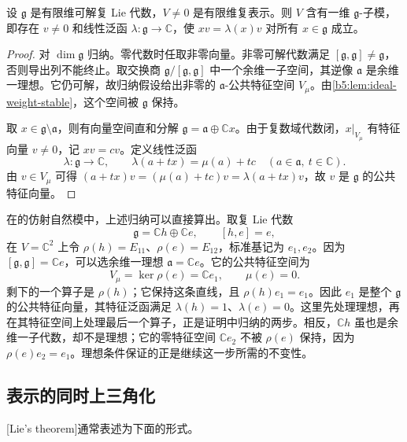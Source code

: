 \begin{theorem}\label{b5:thm:lie-common-eigenvector}
	设 \(\mathfrak g\) 是有限维可解复 Lie 代数，\(V\ne0\) 是有限维复表示。则 \(V\) 含有一维 \(\mathfrak g\)-子模，即存在 \(v\ne0\) 和线性泛函 \(\lambda:\mathfrak g\rightarrow\mathbb C\)，使 \(xv=\lambda(x)v\) 对所有 \(x\in\mathfrak g\) 成立。
\end{theorem}
\begin{proof}
	对 \(\dim\mathfrak g\) 归纳。零代数时任取非零向量。非零可解代数满足 \([\mathfrak g,\mathfrak g]\ne\mathfrak g\)，否则导出列不能终止。取交换商 \(\mathfrak g/[\mathfrak g,\mathfrak g]\) 中一个余维一子空间，其逆像 \(\mathfrak a\) 是余维一理想。它仍可解，故归纳假设给出非零的 \(\mathfrak a\)-公共特征空间 \(V_\mu\)。由\cref{b5:lem:ideal-weight-stable}，这个空间被 \(\mathfrak g\) 保持。

	取 \(x\in\mathfrak g\setminus\mathfrak a\)，则有向量空间直和分解 \(\mathfrak g=\mathfrak a\oplus\mathbb Cx\)。由于复数域代数闭，\(x|_{V_\mu}\) 有特征向量 \(v\ne0\)，记 \(xv=cv\)。定义线性泛函
	\[
		\lambda:\mathfrak g\longrightarrow\mathbb C,\qquad \lambda(a+tx)=\mu(a)+tc \quad(a\in\mathfrak a,\ t\in\mathbb C).
	\]
	由 \(v\in V_\mu\) 可得 \((a+tx)v=(\mu(a)+tc)v=\lambda(a+tx)v\)，故 \(v\) 是 \(\mathfrak g\) 的公共特征向量。
\end{proof}

在的仿射自然模中，上述归纳可以直接算出。取复 Lie 代数
\[
	\mathfrak g=\mathbb Ch\oplus\mathbb Ce,\qquad[h,e]=e,
\]
在 \(V=\mathbb C^2\) 上令 \(\rho(h)=E_{11}\)、\(\rho(e)=E_{12}\)，标准基记为 \(e_1,e_2\)。因为 \([\mathfrak g,\mathfrak g]=\mathbb Ce\)，可以选余维一理想 \(\mathfrak a=\mathbb Ce\)。它的公共特征空间为
\[
	V_\mu=\ker\rho(e)=\mathbb Ce_1,\qquad\mu(e)=0.
\]
剩下的一个算子是 \(\rho(h)\)；它保持这条直线，且 \(\rho(h)e_1=e_1\)。因此 \(e_1\) 是整个 \(\mathfrak g\) 的公共特征向量，其特征泛函满足 \(\lambda(h)=1\)、\(\lambda(e)=0\)。这里先处理理想，再在其特征空间上处理最后一个算子，正是证明中归纳的两步。相反，\(\mathbb Ch\) 虽也是余维一子代数，却不是理想；它的零特征空间 \(\mathbb Ce_2\) 不被 \(\rho(e)\) 保持，因为 \(\rho(e)e_2=e_1\)。理想条件保证的正是继续这一步所需的不变性。

\subsection{表示的同时上三角化}
\label{b5:subsec:1202:02}

[Lie's theorem]通常表述为下面的形式。

